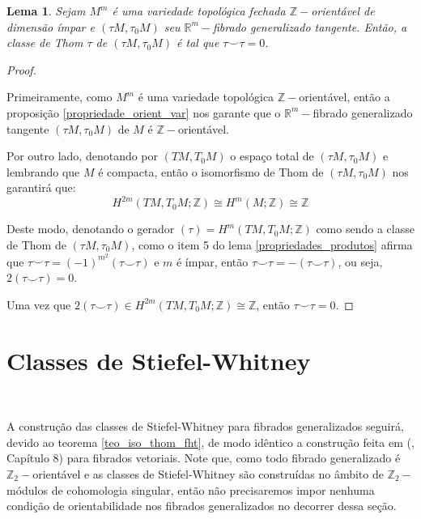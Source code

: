 \documentclass[12pt,oneside]{book} %
\newtheorem{lem}    {\hspace{0.5cm}Lema}[chapter]
\newcommand{\R}{\mathbb{R}}
\newcommand{\Z}{\mathbb{Z}}
\newcommand{\ccup}{\smile}
\begin{document}
\begin{lem}\label{lema_thom_5}
	Sejam $M^{m}$ é uma variedade topológica fechada $\Z-$orientável de dimensão ímpar e $(\tau M,\tau_{0}M)$ seu $\R^{m}-$fibrado generalizado tangente. Então, a classe de Thom $\tau$ de $(\tau M,\tau_{0}M)$ é tal que $\tau\ccup\tau=0$.
\end{lem}
\begin{proof}
	
	\
	
	\par Primeiramente, como $M^{m}$ é uma variedade topológica $\Z-$orientável, então a proposição \ref{propriedade_orient_var} nos garante que o $\R^{m}-$fibrado generalizado tangente $(\tau M,\tau_{0}M)$ de $M$ é $\Z-$orientável.
	
	\par Por outro lado, denotando por $(TM,T_{0}M)$ o espaço total de $(\tau M,\tau_{0}M)$ e lembrando que $M$ é compacta, então o isomorfismo de Thom de $(\tau M,\tau_{0}M)$ nos garantirá que:
	$$ H^{2m}(TM,T_{0}M;\Z)\cong H^{m}(M;\Z)\cong\Z $$
	
	\par Deste modo, denotando o gerador $(\tau)=H^{m}(TM,T_{0}M;\Z)$ como sendo a classe de Thom de $(\tau M,\tau_{0}M)$, como o item 5 do lema \ref{propriedades_produtos} afirma que $\tau\ccup\tau =(-1)^{m^{2}}(\tau\ccup\tau)$ e $m$ é ímpar, então $\tau\ccup\tau=-(\tau\ccup\tau)$, ou seja, $2(\tau\ccup\tau)=0$.
	
	\par Uma vez que $2(\tau\ccup\tau)\in H^{2m}(TM,T_{0}M;\Z)\cong\Z$, então $\tau\ccup\tau=0$.
	
\end{proof}






\section{Classes de Stiefel-Whitney}\label{secao_SW}

\

\par A construção das classes de Stiefel-Whitney para fibrados generalizados seguirá, devido ao teorema \ref{teo_iso_thom_fht}, de modo idêntico a construção feita em (\cite{milnor_1}, Capítulo 8) para fibrados vetoriais. Note que, como todo fibrado generalizado é $\Z_{2}-$orientável e as classes de Stiefel-Whitney são construídas no âmbito de $\Z_{2}-$módulos de cohomologia singular, então não precisaremos impor nenhuma condição de orientabilidade nos fibrados generalizados no decorrer dessa seção.
\end{document}
